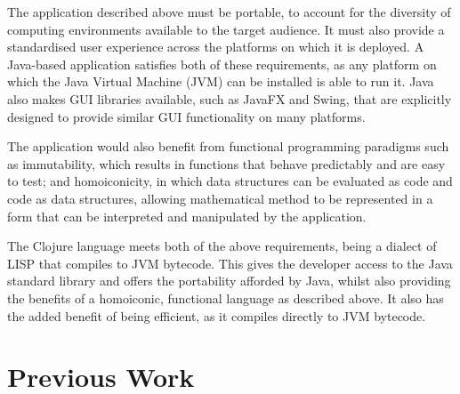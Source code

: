 \documentclass[12pt,twoside,notitlepage,xetex]{report}
\begin{document}
The application described above must be portable, to account for the diversity of computing environments available to the target audience.  It must also provide a standardised user experience across the platforms on which it is deployed.  A Java-based application satisfies both of these requirements, as any platform on which the Java Virtual Machine (JVM) can be installed is able to run it.  Java also makes GUI libraries available, such as JavaFX and Swing, that are explicitly designed to provide similar GUI functionality on many platforms.

The application would also benefit from functional programming paradigms such as immutability, which results in functions that behave predictably and are easy to test; and homoiconicity, in which data structures can be evaluated as code and code as data structures, allowing mathematical method to be represented in a form that can be interpreted and manipulated by the application.

The Clojure language meets both of the above requirements, being a dialect of LISP that compiles to JVM bytecode.  This gives the developer access to the Java standard library and offers the portability afforded by Java, whilst also providing the benefits of a homoiconic, functional language as described above.  It also has the added benefit of being efficient, as it compiles directly to JVM bytecode.

\section{Previous Work}
\end{document}
